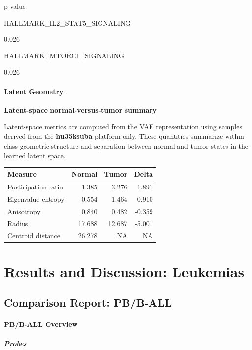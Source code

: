 \documentclass[
  letterpaper,
  DIV=11,
  numbers=noendperiod,
  openany,
  oneside]{scrreprt}
\begin{document}
p-value

HALLMARK\_IL2\_STAT5\_SIGNALING

0.026

HALLMARK\_MTORC1\_SIGNALING

0.026

\subsection{Latent Geometry}

\textbf{Latent-space normal-versus-tumor summary}

Latent-space metrics are computed from the VAE representation using
samples derived from the \textbf{hu35ksuba} platform only. These
quantities summarize within-class geometric structure and separation
between normal and tumor states in the learned latent space.

\begin{longtable}[]{@{}lrrr@{}}
\toprule\noalign{}
Measure & Normal & Tumor & Delta \\
\midrule\noalign{}
\endhead
\bottomrule\noalign{}
\endlastfoot
Participation ratio & 1.385 & 3.276 & 1.891 \\
Eigenvalue entropy & 0.554 & 1.464 & 0.910 \\
Anisotropy & 0.840 & 0.482 & -0.359 \\
Radius & 17.688 & 12.687 & -5.001 \\
Centroid distance & 26.278 & NA & NA \\
\end{longtable}

\part{Results and Discussion: Leukemias}

\chapter{Comparison Report: PB/B-ALL}\label{comparison-report-pbb-all}

\subsection{PB/B-ALL Overview}

\subsubsection{Probes}
\end{document}
